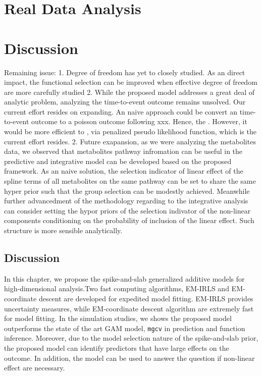 \documentclass[AMA,STIX1COL,]{WileyNJD-v2}
\begin{document}
\hypertarget{real-data-analysis}{%
\section{Real Data Analysis}\label{real-data-analysis}}

\hypertarget{discussion}{%
\section{Discussion}\label{discussion}}

Remaining issue: 1. Degree of freedom has yet to closely studied. As an
direct impact, the functional selection can be improved when effective
degree of freedom are more carefully studied 2. While the proposed model
addresses a great deal of analytic problem, analyzing the time-to-event
outcome remains unsolved. Our current effort resides on expanding. An
naive approach could be convert an time-to-event outcome to a poisson
outcome following xxx. Hence, the . However, it would be more efficient
to , via penalized pseudo likelihood function, which is the current
effort resides. 2. Future exapansion, as we were analyzing the
metabolites data, we observed that metabolites pathway infromation can
be useful in the predictive and integrative model can be developed based
on the proposed framework. As an naive solution, the selection indicator
of linear effect of the spline terms of all metabolites on the same
pathway can be set to share the same hyper prior such that the group
selection can be modestly achieved. Meanwhile further advancedment of
the methodology regarding to the integrative analysis can consider
setting the hypor priors of the selection indivator of the non-linear
components conditioning on the probability of inclusion of the linear
effect. Such structure is more sensible analytically.

\hypertarget{discussion-1}{%
\subsection{Discussion}\label{discussion-1}}

In this chapter, we propose the spike-and-slab generalized additive
models for high-dimensional analysis.Two fast computing algorithms,
EM-IRLS and EM-coordinate descent are developed for expedited model
fitting. EM-IRLS provides uncertainty measures, while EM-coordinate
descent algorithm are extremely fast for model fitting. In the
simulation studies, we shows the proposed model outperforms the state of
the art GAM model, \texttt{mgcv} in prediction and function inference.
Moreover, due to the model selection nature of the spike-and-slab prior,
the proposed model can identify predictors that have large effects on
the outcome. In addition, the model can be used to answer the question
if non-linear effect are necessary.
\end{document}
